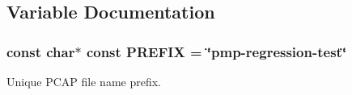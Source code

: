 \subsection{Variable Documentation}
\subsubsection[{\texorpdfstring{P\+R\+E\+F\+IX}{PREFIX}}]{\setlength{\rightskip}{0pt plus 5cm}const char$\ast$ const P\+R\+E\+F\+IX = \char`\"{}pmp-\/regression-\/{\bf test}\char`\"{}}\hypertarget{pmp-regression_8cc_a61dc66981fa47bfd0066a57a487c599c}{}\label{pmp-regression_8cc_a61dc66981fa47bfd0066a57a487c599c}


Unique P\+C\+AP file name prefix. 

